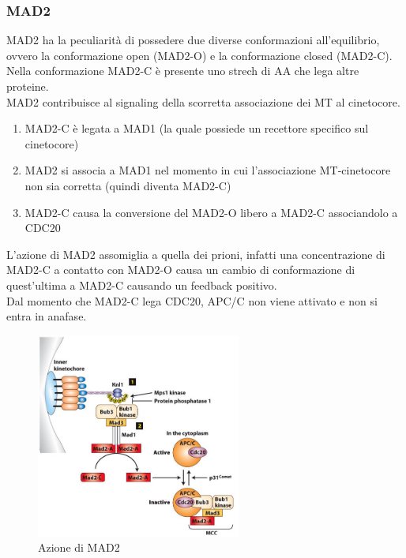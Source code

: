         \subsubsection{MAD2}
            MAD2 ha la peculiarità di possedere due diverse conformazioni all'equilibrio, ovvero la conformazione open (MAD2-O) e la conformazione closed (MAD2-C). Nella conformazione MAD2-C è presente uno strech di AA che lega altre proteine. \\
            MAD2 contribuisce al signaling della scorretta associazione dei MT al cinetocore.
            \begin{enumerate}
                \item MAD2-C è legata a MAD1 (la quale possiede un recettore specifico sul cinetocore)
                \item MAD2 si associa a MAD1 nel momento in cui l'associazione MT-cinetocore non sia corretta (quindi diventa MAD2-C)
                \item MAD2-C causa la conversione del MAD2-O libero a MAD2-C associandolo a CDC20
            \end{enumerate}
            L'azione di MAD2 assomiglia a quella dei prioni, infatti una concentrazione di MAD2-C a contatto con MAD2-O causa un cambio di conformazione di quest'ultima a MAD2-C causando un feedback positivo.  \\
            Dal momento che MAD2-C lega CDC20, APC/C non viene attivato e non si entra in anafase.
        
            \begin{figure}[h]
                \centering
                \includegraphics[width=0.6\textwidth]{images/MAD2.JPG}
                \caption{\small Azione di MAD2}            
                \label{fig:mesh1}
            \end{figure} 
    
